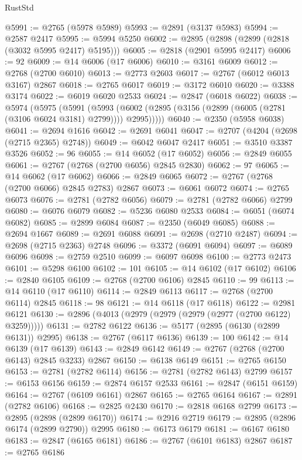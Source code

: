 \begin{lexlean}{RustStd}
\begin{coremodule}
@5991 := @2765 (@5978 @5989)
@5993 := @2891 (@3137 @5983)
@5994 := @2587 @2417
@5995 := @5994 @5250
@6002 := @2895 (@2898 (@2899 (@2818 (@3032 @5995 @2417) @5195)))
@6005 := @2818 (@2901 @5995 @2417)
@6006 := 92
@6009 := @14 @6006 (@17 @6006)
@6010 := @3161 @6009
@6012 := @2768 (@2700 @6010)
@6013 := @2773 @2603
@6017 := @2767 (@6012 @6013 @3167) @2867
@6018 := @2765 @6017
@6019 := @3172 @6010
@6020 := @3388 @3174
@6022 := @6019 @6020 @2533
@6024 := @2847 (@6018 @6022)
@6038 := @5974
    (@5975
      (@5991
        (@5993 (@6002 (@2895 (@3156 (@2899 (@6005 (@2781 (@3106 @6024 @3181) @2799)))) @2995)))))
@6040 := @2350 (@5958 @6038)
@6041 := @2694 @1616
@6042 := @2691 @6041
@6047 := @2707 (@4204 (@2698 (@2715 @2365) @2748))
@6049 := @6042 @6047 @2417
@6051 := @3510 @3387 @3526
@6052 := 96
@6055 := @14 @6052 (@17 @6052)
@6056 := @2849 @6055
@6061 := @2767 (@2768 (@2700 @6056) @2845 @2830)
@6062 := 97
@6065 := @14 @6062 (@17 @6062)
@6066 := @2849 @6065
@6072 := @2767 (@2768 (@2700 @6066) @2845 @2783) @2867
@6073 := @6061 @6072
@6074 := @2765 @6073
@6076 := @2781 (@2782 @6056)
@6079 := @2781 (@2782 @6066) @2799
@6080 := @6076 @6079
@6082 := @5236 @6080 @2533
@6084 := @6051 (@6074 @6082)
@6085 := @2899 @6084
@6087 := @2350 (@6049 @6085)
@6088 := @2694 @1667
@6089 := @2691 @6088
@6091 := @2698 (@2710 @2487)
@6094 := @2698 (@2715 @2363) @2748
@6096 := @3372 (@6091 @6094)
@6097 := @6089 @6096
@6098 := @2759 @2510
@6099 := @6097 @6098
@6100 := @2773 @2473
@6101 := @5298 @6100
@6102 := 101
@6105 := @14 @6102 (@17 @6102)
@6106 := @2840 @6105
@6109 := @2768 (@2700 @6106) @2845
@6110 := 99
@6113 := @14 @6110 (@17 @6110)
@6114 := @2849 @6113
@6117 := @2768 (@2700 @6114) @2845
@6118 := 98
@6121 := @14 @6118 (@17 @6118)
@6122 := @2981 @6121
@6130 := @2896 (@4013 (@2979 (@2979 (@2979 (@2977 (@2700 @6122) @3259)))))
@6131 := @2782 @6122
@6136 := @5177 (@2895 (@6130 (@2899 @6131)) @2995)
@6138 := @2767 (@6117 @6136)
@6139 := 100
@6142 := @14 @6139 (@17 @6139)
@6143 := @2849 @6142
@6149 := @2767 (@2768 (@2700 @6143) @2845 @3233) @2867
@6150 := @6138 @6149
@6151 := @2765 @6150
@6153 := @2781 (@2782 @6114)
@6156 := @2781 (@2782 @6143) @2799
@6157 := @6153 @6156
@6159 := @2874 @6157 @2533
@6161 := @2847 (@6151 @6159)
@6164 := @2767 (@6109 @6161) @2867
@6165 := @2765 @6164
@6167 := @2891 (@2782 @6106)
@6168 := @2825 @2430
@6170 := @2818 @6168 @2799
@6173 := @2895 (@2898 (@2899 @6170))
@6174 := @2916 @2719
@6179 := @2895 (@2896 @6174 (@2899 @2790)) @2995
@6180 := @6173 @6179
@6181 := @6167 @6180
@6183 := @2847 (@6165 @6181)
@6186 := @2767 (@6101 @6183) @2867
@6187 := @2765 @6186

\end{coremodule}
\end{lexlean}
